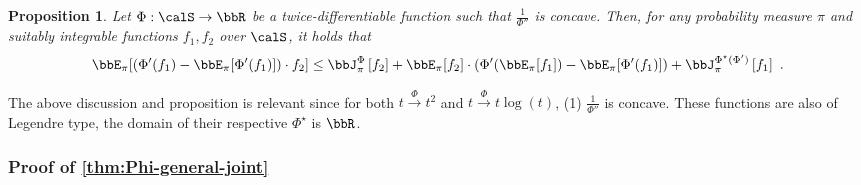 \documentclass[11pt]{article}
\newtheorem{proposition}{Proposition}[section]
\newcounter{ct}
\newcommand{\Phient}[3]{
    \ensuremath{\if$#3$\bbJ_{#1}^{#2}\else\bbJ_{#1}^{#2}\left[#3\right]\fi}}
\begin{document}
\begin{proposition}
\label{prop:product-phi-entropy}
Let \(\Phi : \calS \to \bbR\) be a twice-differentiable function such that \(\frac{1}{\Phi''}\) is concave.
Then, for any probability measure \(\pi\) and suitably integrable functions \(f_{1}, f_{2}\) over \(\calS\), it holds that
\begin{equation*}
    \bbE_{\pi}[(\Phi'(f_{1}) - \bbE_{\pi}[\Phi'(f_{1})]) \cdot f_{2}] \leq \Phient{\pi}{\Phi}{f_{2}} + \bbE_{\pi}[f_{2}] \cdot (\Phi'(\bbE_{\pi}[f_{1}]) - \bbE_{\pi}[\Phi'(f_{1})]) + \Phient{\pi}{\Phi^{\star}(\Phi')}{f_{1}}~.
\end{equation*}
\end{proposition}
The above discussion and proposition is relevant since for both \(t \xrightarrow{\Phi} t^{2}\) and \(t \xrightarrow{\Phi} t\log(t)\), (1) \(\frac{1}{\Phi''}\) is concave.
These functions are also of Legendre type, the domain of their respective \(\Phi^{\star}\) is \(\bbR\).

\subsubsection{Proof of \cref{thm:Phi-general-joint}}
\label{sec:prf:joint}
\end{document}

